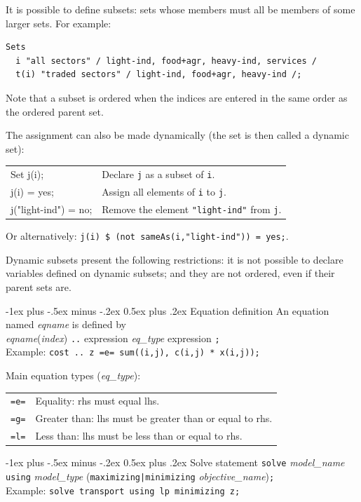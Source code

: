 \documentclass[10pt,landscape,a4paper]{article}
\makeatletter
\renewcommand{\section}{\@startsection{section}{1}{0mm}%
                                {-1ex plus -.5ex minus -.2ex}%
                                {0.5ex plus .2ex}%
                                {\color{blue}\normalfont\large\bfseries}}
\makeatother
\begin{document}
\begin{multicols}{2}
It is possible to define subsets: sets whose members must all be members of some
larger sets. For example:\\
\begin{verbatim}
Sets
  i "all sectors" / light-ind, food+agr, heavy-ind, services /
  t(i) "traded sectors" / light-ind, food+agr, heavy-ind /;
\end{verbatim}
Note that a subset is ordered when the indices are entered in the same order as
the ordered parent set.

The assignment can also be made dynamically (the set is then called a dynamic
set):
\begin{tabularx}{\columnwidth}{@{}>{\ttfamily}l>{\raggedright\arraybackslash}X@{}}
Set j(i);& Declare \texttt{j} as a subset of \texttt{i}. \\
j(i) = yes;& Assign all elements of \texttt{i} to \texttt{j}.\\
j("light-ind") = no;& Remove the element \texttt{"light-ind"} from \texttt{j}.
\end{tabularx}
Or alternatively: \texttt{j(i) \$ (not sameAs(i,"light-ind")) = yes;}.

Dynamic subsets present the following restrictions: it is not possible to
declare variables defined on dynamic subsets; and they are not ordered, even if
their parent sets are.

\section{Equation definition}
An equation named \emph{eqname} is defined by\\
\emph{eqname}(\emph{index}) \verb!..! expression \emph{eq\_type} expression \verb!;!\\
Example: \verb!cost .. z =e= sum((i,j), c(i,j) * x(i,j));!

Main equation types (\emph{eq\_type}):\\
\begin{tabular}{@{}ll@{}}
  \verb!=e=! & Equality: rhs must equal lhs.\\
  \verb!=g=! & Greater than: lhs must be greater than or equal to rhs.\\
  \verb!=l=! & Less than: lhs must be less than or equal to rhs.
\end{tabular}

\columnbreak{}
\section{Solve statement}
\verb!solve! \emph{model\_name} \verb!using! \emph{model\_type} (\verb!maximizing|minimizing! \emph{objective\_name})\verb!;!\\
Example: \verb!solve transport using lp minimizing z;!


\end{multicols}
\end{document}
